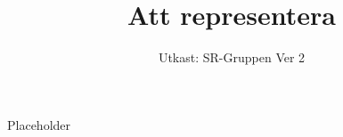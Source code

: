 \documentclass[a4paper]{dtek}
\title{Att representera}
\date{Utkast: SR-Gruppen Ver 2}
\begin{document}
Placeholder
\end{document}
